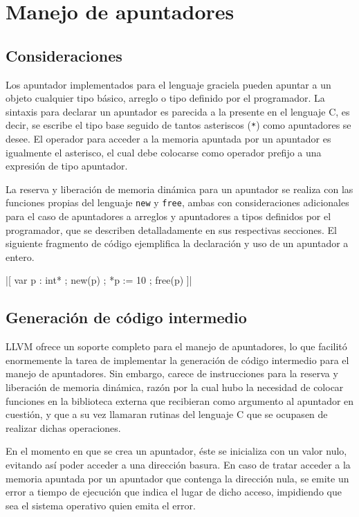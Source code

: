 \section{Manejo de apuntadores}

\subsection{Consideraciones}
Los apuntador implementados para el lenguaje graciela pueden apuntar a un
objeto cualquier tipo básico, arreglo o tipo definido por el programador. La
sintaxis para declarar un apuntador es parecida a la presente en  el lenguaje
C, es decir, se escribe el tipo base seguido de tantos asteriscos (\texttt{*})
como apuntadores se desee. El operador para acceder a la memoria apuntada por
un apuntador es igualmente el asterisco, el cual debe colocarse como operador
prefijo a una expresión de tipo apuntador.

La reserva y liberación de memoria dinámica para un apuntador se realiza con las
funciones propias del lenguaje \texttt{new} y \texttt{free}, ambas con
consideraciones adicionales para el caso de apuntadores a arreglos y apuntadores
a tipos definidos por el programador, que se describen detalladamente en sus
respectivas secciones. El siguiente fragmento de código ejemplifica la
declaración y uso de un apuntador a entero.

\begin{gracielacode}
  |[ var p : int*
  ;  new(p)
  ;  *p := 10
  ;  free(p)
  ]|
\end{gracielacode}

\subsection{Generación de código intermedio}

LLVM ofrece un soporte completo para el manejo de apuntadores, lo que facilitó
enormemente la tarea de implementar la generación de código intermedio para el
manejo de apuntadores. Sin embargo, carece de instrucciones para la reserva y
liberación de memoria dinámica, razón por la cual hubo la necesidad de colocar
funciones en la biblioteca externa que recibieran como argumento al apuntador en
cuestión, y que a su vez llamaran rutinas del lenguaje C que se ocupasen de
realizar dichas operaciones.

En el momento en que se crea un apuntador, éste se inicializa con un valor nulo,
evitando así poder acceder a una dirección basura. En caso de tratar acceder a
la memoria apuntada por un apuntador que contenga la dirección nula, se emite un
error a tiempo de ejecución que indica el lugar de dicho acceso, impidiendo que
sea el sistema operativo quien emita el error.

